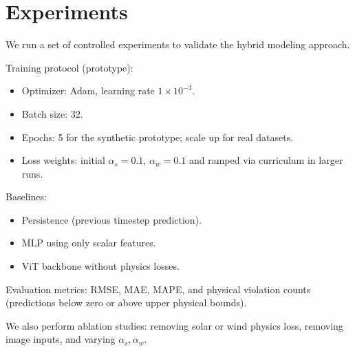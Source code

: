 \section*{Experiments}

We run a set of controlled experiments to validate the hybrid modeling approach.

Training protocol (prototype):
\begin{itemize}
	\item Optimizer: Adam, learning rate $1\times 10^{-3}$.
	\item Batch size: 32.
	\item Epochs: 5 for the synthetic prototype; scale up for real datasets.
	\item Loss weights: initial $\alpha_s=0.1$, $\alpha_w=0.1$ and ramped via curriculum in larger runs.
\end{itemize}

Baselines:
\begin{itemize}
	\item Persistence (previous timestep prediction).
	\item MLP using only scalar features.
	\item ViT backbone without physics losses.
\end{itemize}

Evaluation metrics: RMSE, MAE, MAPE, and physical violation counts (predictions below zero or above upper physical bounds).

We also perform ablation studies: removing solar or wind physics loss, removing image inputs, and varying $\alpha_s,\alpha_w$.
